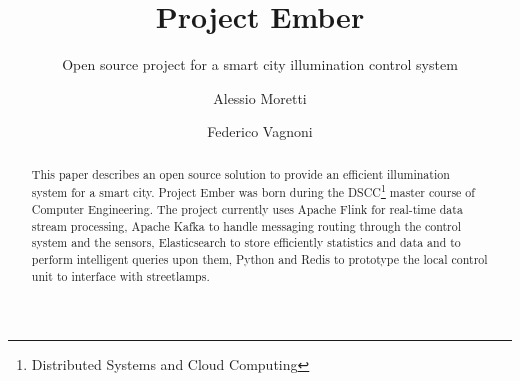 \documentclass[sigconf, authordraft]{acmart}
\begin{document}
\title{Project Ember}
\subtitle{Open source project for a smart city illumination control system}

\author{Alessio Moretti}

\author{Federico Vagnoni}


\begin{abstract}
	This paper describes an open source solution to provide an efficient illumination system for a smart city. Project Ember was born during the DSCC\footnote{Distributed Systems and Cloud Computing} master course of Computer Engineering. The project currently uses Apache Flink for real-time data stream processing, Apache Kafka to handle messaging routing through the control system and the sensors, Elasticsearch to store efficiently statistics and data and to perform intelligent queries upon them, Python and Redis to prototype the local control unit to interface with streetlamps.
\end{abstract}


	
\maketitle
	

	

\end{document}
